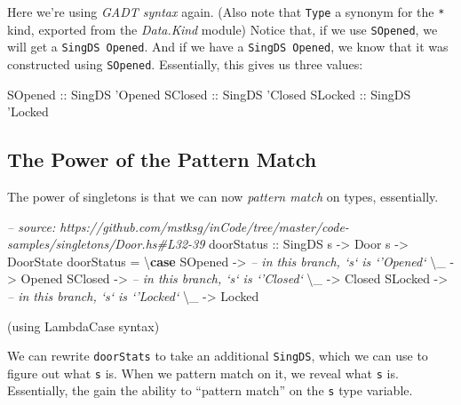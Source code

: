 \documentclass[]{article}
\newenvironment{Shaded}{}{}
\newcommand{\KeywordTok}[1]{\textcolor[rgb]{0.00,0.44,0.13}{\textbf{#1}}}
\newcommand{\DataTypeTok}[1]{\textcolor[rgb]{0.56,0.13,0.00}{#1}}
\newcommand{\CharTok}[1]{\textcolor[rgb]{0.25,0.44,0.63}{#1}}
\newcommand{\CommentTok}[1]{\textcolor[rgb]{0.38,0.63,0.69}{\textit{#1}}}
\newcommand{\OtherTok}[1]{\textcolor[rgb]{0.00,0.44,0.13}{#1}}
\newcommand{\FunctionTok}[1]{\textcolor[rgb]{0.02,0.16,0.49}{#1}}
\newcommand{\NormalTok}[1]{#1}
\begin{document}
Here we're using \emph{GADT syntax} again. (Also note that \texttt{Type} a
synonym for the \texttt{*} kind, exported from the \emph{Data.Kind} module)
Notice that, if we use \texttt{SOpened}, we will get a
\texttt{SingDS\ \textquotesingle{}Opened}. And if we have a
\texttt{SingDS\ \textquotesingle{}Opened}, we know that it was constructed using
\texttt{SOpened}. Essentially, this gives us three values:

\begin{Shaded}
\begin{Highlighting}[]
\DataTypeTok{SOpened}\OtherTok{ ::} \DataTypeTok{SingDS} \CharTok{'Opened}
\DataTypeTok{SClosed}\OtherTok{ ::} \DataTypeTok{SingDS} \CharTok{'Closed}
\DataTypeTok{SLocked}\OtherTok{ ::} \DataTypeTok{SingDS} \CharTok{'Locked}
\end{Highlighting}
\end{Shaded}

\subsection{The Power of the Pattern
Match}\label{the-power-of-the-pattern-match}

The power of singletons is that we can now \emph{pattern match} on types,
essentially.

\begin{Shaded}
\begin{Highlighting}[]
\CommentTok{-- source: https://github.com/mstksg/inCode/tree/master/code-samples/singletons/Door.hs#L32-39}
\OtherTok{doorStatus ::} \DataTypeTok{SingDS}\NormalTok{ s }\OtherTok{->} \DataTypeTok{Door}\NormalTok{ s }\OtherTok{->} \DataTypeTok{DoorState}
\NormalTok{doorStatus }\FunctionTok{=}\NormalTok{ \textbackslash{}}\KeywordTok{case}
    \DataTypeTok{SOpened} \OtherTok{->} \CommentTok{-- in this branch, `s` is `'Opened`}
\NormalTok{        \textbackslash{}_ }\OtherTok{->} \DataTypeTok{Opened}
    \DataTypeTok{SClosed} \OtherTok{->} \CommentTok{-- in this branch, `s` is `'Closed`}
\NormalTok{        \textbackslash{}_ }\OtherTok{->} \DataTypeTok{Closed}
    \DataTypeTok{SLocked} \OtherTok{->} \CommentTok{-- in this branch, `s` is `'Locked`}
\NormalTok{        \textbackslash{}_ }\OtherTok{->} \DataTypeTok{Locked}
\end{Highlighting}
\end{Shaded}

(using LambdaCase syntax)

We can rewrite \texttt{doorStats} to take an additional \texttt{SingDS}, which
we can use to figure out what \texttt{s} is. When we pattern match on it, we
reveal what \texttt{s} is. Essentially, the gain the ability to ``pattern
match'' on the \texttt{s} type variable.
\end{document}
